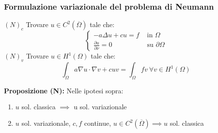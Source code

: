 \subsubsection{Formulazione variazionale del problema di Neumann}
$(N)_c$ Trovare $u\in C^2(\overline\Omega)$ tale che:
\[\begin{cases}
	-a\Delta u+cu=f&\text{ in }\Omega
	\\\frac{\partial u}{\partial \nu} =0&\text{ su }\partial \Omega
\end{cases}\]
$(N)_v$ Trovare $u\in H^1(\Omega)$ tale che:
\[\int_{\Omega}^{} a\nabla u\cdot \nabla v+cuv=\int_{\Omega}^{} fv\ \forall v\in H^1(\Omega)\]
\begin{tcolorbox}
	\textbf{Proposizione (N):} Nelle ipotesi sopra:
	\begin{enumerate}
		\item $u$ sol. classica $\implies $ u sol. variazionale
		\item $u$ sol. variazionale, $c,f$ continue, $u\in C^2(\overline\Omega)\implies u$ sol. classica
	\end{enumerate}
\end{tcolorbox}
